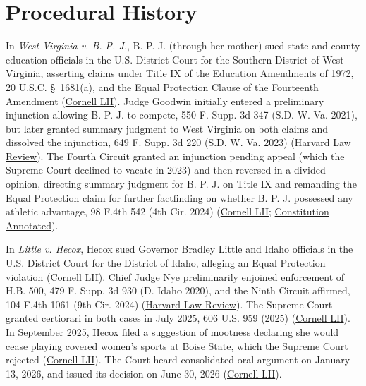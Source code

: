 \documentclass[12pt]{article}
\begin{document}
\section{Procedural History}

In \textit{West Virginia v. B. P. J.}, B. P. J. (through her mother) sued state and county education officials in the U.S. District Court for the Southern District of West Virginia, asserting claims under Title IX of the Education Amendments of 1972, 20 U.S.C. \S~1681(a), and the Equal Protection Clause of the Fourteenth Amendment (\href{https://www.law.cornell.edu/supremecourt/text/24-43}{Cornell LII}). Judge Goodwin initially entered a preliminary injunction allowing B. P. J. to compete, 550 F. Supp. 3d 347 (S.D. W. Va. 2021), but later granted summary judgment to West Virginia on both claims and dissolved the injunction, 649 F. Supp. 3d 220 (S.D. W. Va. 2023) (\href{https://harvardlawreview.org/print/vol-140/west-virginia-v-b-p-j-ex-rel-jackson/}{Harvard Law Review}). The Fourth Circuit granted an injunction pending appeal (which the Supreme Court declined to vacate in 2023) and then reversed in a divided opinion, directing summary judgment for B. P. J. on Title IX and remanding the Equal Protection claim for further factfinding on whether B. P. J. possessed any athletic advantage, 98 F.4th 542 (4th Cir. 2024) (\href{https://www.law.cornell.edu/supremecourt/text/24-43}{Cornell LII}; \href{https://constitution.congress.gov/browse/essay/intro.9-4-7/ALDE_00000140/}{Constitution Annotated}).

In \textit{Little v. Hecox}, Hecox sued Governor Bradley Little and Idaho officials in the U.S. District Court for the District of Idaho, alleging an Equal Protection violation (\href{https://www.law.cornell.edu/supremecourt/text/24-43}{Cornell LII}). Chief Judge Nye preliminarily enjoined enforcement of H.B. 500, 479 F. Supp. 3d 930 (D. Idaho 2020), and the Ninth Circuit affirmed, 104 F.4th 1061 (9th Cir. 2024) (\href{https://harvardlawreview.org/print/vol-140/west-virginia-v-b-p-j-ex-rel-jackson/}{Harvard Law Review}). The Supreme Court granted certiorari in both cases in July 2025, 606 U.S. 959 (2025) (\href{https://www.law.cornell.edu/supremecourt/text/24-43}{Cornell LII}). In September 2025, Hecox filed a suggestion of mootness declaring she would cease playing covered women's sports at Boise State, which the Supreme Court rejected (\href{https://www.law.cornell.edu/supremecourt/text/24-43}{Cornell LII}). The Court heard consolidated oral argument on January 13, 2026, and issued its decision on June 30, 2026 (\href{https://www.law.cornell.edu/supremecourt/text/24-43}{Cornell LII}).
\end{document}

